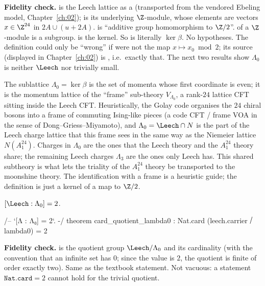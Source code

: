 \begin{dictionary}
\textbf{Fidelity check.}   is the Leech lattice as a 
(transported from the vendored Ebeling model, Chapter~\ref{ch:02});  is its
underlying $\Z$-module, whose elements are vectors $x\in\Z^{24}$ in $2A\cup(u+2A)$.
 is ``additive group homomorphism to $\Z/2$''.   of a $\Z$-module
is a subgroup.   is the kernel.  So  is literally
$\ker\beta$.  No hypotheses.  The definition could only be ``wrong'' if  were not
the map $x\mapsto x_0\bmod2$; its source (displayed in Chapter~\ref{ch:02}) is
, i.e.\ exactly that.  The next two results
show $\Lambda_0$ is neither $\Leech$ nor trivially small.
\end{dictionary}

\begin{physics}
The sublattice $\Lambda_0=\ker\beta$ is the set of momenta whose first coordinate is even; it is the momentum lattice of the ``frame'' sub-theory $V_{\Lambda_0}$, a rank-$24$ lattice CFT sitting inside the Leech CFT. Heuristically, the Golay code organises the $24$ chiral bosons into a frame of commuting Ising-like pieces (a code CFT / frame VOA in the sense of Dong--Griess--Miyamoto), and $\Lambda_0=\Leech\cap N$ is the part of the Leech charge lattice that this frame sees in the same way as the Niemeier lattice $N(A_1^{24})$. Charges in $\Lambda_0$ are the ones that the Leech theory and the $A_1^{24}$ theory share; the remaining Leech charges $\Lambda_3$ are the ones only Leech has. This shared subtheory is what lets the triality of the $A_1^{24}$ theory be transported to the moonshine theory. The identification with a frame is a heuristic guide; the definition is just a kernel of a map to $\Z/2$.
\end{physics}

\begin{proposition}\label{ch11:prop:index}
$[\Leech:\Lambda_0]=2$.
\end{proposition}
\begin{leancode}
/-- `[Λ : Λ₀] = 2`. -/
theorem card_quotient_lambda0 : Nat.card (leech.carrier ⧸ lambda0) = 2
\end{leancode}
\begin{dictionary}
\textbf{Fidelity check.}   is the quotient group $\Leech/\Lambda_0$
and  its cardinality (with the convention that an infinite set has 
$0$; since the value is $2$, the quotient is finite of order exactly two).  Same as the textbook
statement.  Not vacuous: a statement $\mathtt{Nat.card}=2$ cannot hold for the trivial quotient.
\end{dictionary}

